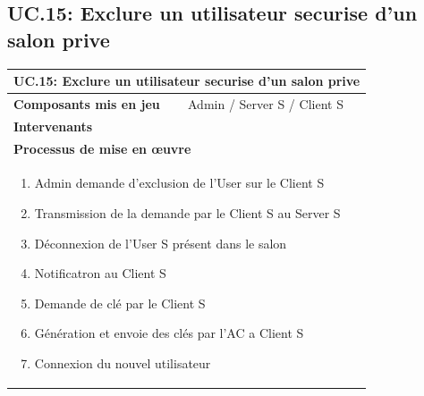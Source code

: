 \documentclass[a4paper,11pt,french]{article}
\begin{document}
\subsection{UC.15: Exclure un utilisateur securise d'un salon prive}
\begin{center}
	\vspace*{0.7cm}
	\begin{tabularx}{16cm}{|l|X|}
	\hline
	\multicolumn{2}{|l|}{\textbf{UC.15: Exclure un utilisateur securise d'un salon prive}}\\
	\hline
	\textbf{Composants mis en jeu} & Admin / Server S / Client S \\
	\hline
	\textbf{Intervenants} & \\
	\hline
	\multicolumn{2}{|l|}{\textbf{Processus de mise en \oe uvre}}\\
	\hline
	\multicolumn{2}{|p{15cm}|}{\begin{enumerate}\item Admin demande d'exclusion de l'User sur le Client S \item Transmission de la demande par le Client S au Server S \item Déconnexion de l'User S présent dans le salon \item Notificatron au Client S \item Demande de clé par le Client S \item Génération et envoie des clés par l'AC a Client S \item Connexion du nouvel utilisateur \end{enumerate}}\\
	\hline
	\end{tabularx}
\end{center}

\end{document}
